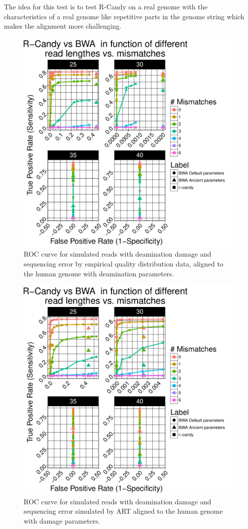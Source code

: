 \documentclass[11pt,a4paper]{report}
\begin{document}
The idea for this test is to test R-Candy on a real genome with the characteristics of 
a real genome like repetitive parts in the genome string which makes the alignment more challenging.

\begin{figure}[H]
\centering
\includegraphics[width=12cm]{pictures/bROC_DS4_emp.pdf}
\caption{ROC curve for simulated reads with deamination damage and sequencing error 
by empirical quality distribution data, aligned to the human genome
         with deamination parameters.}
\label{DS4_emp}
\end{figure}

\begin{figure}[H]
\centering
\includegraphics[width=12cm]{pictures/bROC_DS4_ART.pdf}
\caption{ROC curve for simulated reads with deamination damage and sequencing error 
simulated by ART aligned to the human genome
         with damage parameters.}
\label{DS4_ART}
\end{figure}
\end{document}
